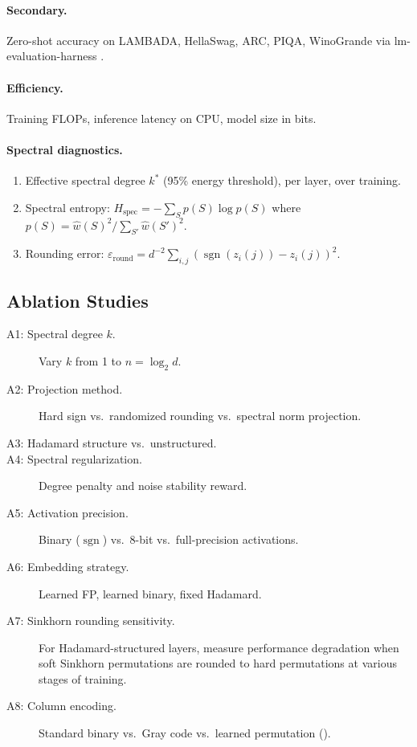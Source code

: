 \documentclass[12pt,a4paper]{article}
\theoremstyle{plain}
\theoremstyle{definition}
\theoremstyle{remark}
\newcommand{\what}{\widehat{w}}
\newcommand{\sgn}{\operatorname{sgn}}
\begin{document}
\paragraph{Secondary.} Zero-shot accuracy on LAMBADA, HellaSwag, ARC, PIQA, WinoGrande via lm-evaluation-harness \citep{gao2021framework}.

\paragraph{Efficiency.} Training FLOPs, inference latency on CPU, model size in bits.

\paragraph{Spectral diagnostics.}
\begin{enumerate}[label=(\roman*)]
    \item Effective spectral degree $k^*$ (95\% energy threshold), per layer, over training.
    \item Spectral entropy: $H_{\text{spec}} = -\sum_S p(S) \log p(S)$ where $p(S) = \what(S)^2 / \sum_{S'} \what(S')^2$.
    \item Rounding error: $\varepsilon_{\text{round}} = d^{-2} \sum_{i,j} (\sgn(z_i(j)) - z_i(j))^2$.
\end{enumerate}

\subsection{Ablation Studies}\label{sec:ablations}

\begin{description}
    \item[A1: Spectral degree $k$.] Vary $k$ from 1 to $n = \log_2 d$.
    \item[A2: Projection method.] Hard sign vs.\ randomized rounding vs.\ spectral norm projection.
    \item[A3: Hadamard structure vs.\ unstructured.]
    \item[A4: Spectral regularization.] Degree penalty and noise stability reward.
    \item[A5: Activation precision.] Binary ($\sgn$) vs.\ 8-bit vs.\ full-precision activations.
    \item[A6: Embedding strategy.] Learned FP, learned binary, fixed Hadamard.
    \item[A7: Sinkhorn rounding sensitivity.] For Hadamard-structured layers, measure performance degradation when soft Sinkhorn permutations are rounded to hard permutations at various stages of training.
    \item[A8: Column encoding.] Standard binary vs.\ Gray code vs.\ learned permutation ().
\end{description}
\end{document}
